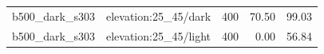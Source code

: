 \begin{longtable}{l>{\raggedright\arraybackslash}p{.42\linewidth}rrr}
b500\_\allowbreak{}dark\_\allowbreak{}s303 & %
elevation:25\_\allowbreak{}45/dark & %
400 & %
70.50 & %
99.03 \\ %

b500\_\allowbreak{}dark\_\allowbreak{}s303 & %
elevation:25\_\allowbreak{}45/light & %
400 & %
0.00 & %
56.84 \\ %


\end{longtable}
